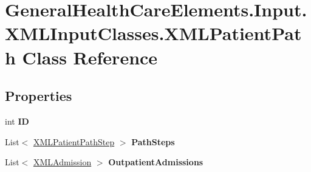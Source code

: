 \hypertarget{class_general_health_care_elements_1_1_input_1_1_x_m_l_input_classes_1_1_x_m_l_patient_path}{}\section{General\+Health\+Care\+Elements.\+Input.\+X\+M\+L\+Input\+Classes.\+X\+M\+L\+Patient\+Path Class Reference}
\label{class_general_health_care_elements_1_1_input_1_1_x_m_l_input_classes_1_1_x_m_l_patient_path}
\subsection*{Properties}
\begin{DoxyCompactItemize}
\item 
int {\bfseries ID}\hypertarget{class_general_health_care_elements_1_1_input_1_1_x_m_l_input_classes_1_1_x_m_l_patient_path_ae2f8887cd07f90c064cfbf7ba4a37c6a}{}\label{class_general_health_care_elements_1_1_input_1_1_x_m_l_input_classes_1_1_x_m_l_patient_path_ae2f8887cd07f90c064cfbf7ba4a37c6a}

\item 
List$<$ \hyperlink{class_general_health_care_elements_1_1_input_1_1_x_m_l_input_classes_1_1_x_m_l_patient_path_step}{X\+M\+L\+Patient\+Path\+Step} $>$ {\bfseries Path\+Steps}\hypertarget{class_general_health_care_elements_1_1_input_1_1_x_m_l_input_classes_1_1_x_m_l_patient_path_a3f4c5f2d764889201825d6ea3f638770}{}\label{class_general_health_care_elements_1_1_input_1_1_x_m_l_input_classes_1_1_x_m_l_patient_path_a3f4c5f2d764889201825d6ea3f638770}

\item 
List$<$ \hyperlink{class_general_health_care_elements_1_1_input_1_1_x_m_l_input_classes_1_1_x_m_l_admission}{X\+M\+L\+Admission} $>$ {\bfseries Outpatient\+Admissions}\hypertarget{class_general_health_care_elements_1_1_input_1_1_x_m_l_input_classes_1_1_x_m_l_patient_path_a92c358157a71bd8a4aae20b0f614ecc9}{}\label{class_general_health_care_elements_1_1_input_1_1_x_m_l_input_classes_1_1_x_m_l_patient_path_a92c358157a71bd8a4aae20b0f614ecc9}


\end{DoxyCompactItemize}
